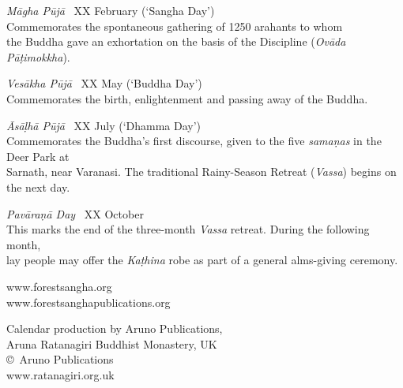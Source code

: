 {{\emph{Māgha Pūjā} \spacedcdot\ XX February (`Sangha Day')\\
Commemorates the spontaneous gathering of 1250 arahants to whom\\
the Buddha gave an exhortation on the basis of the Discipline (\emph{Ovāda Pāṭimokkha}).

\emph{Vesākha Pūjā} \spacedcdot\ XX May (`Buddha Day')\\
Commemorates the birth, enlightenment and passing away of the Buddha.

\emph{Āsāḷhā Pūjā} \spacedcdot\ XX July (`Dhamma Day')\\
Commemorates the Buddha's first discourse, given to the five \emph{samaṇas} in the Deer Park at\\
Sarnath, near Varanasi. The traditional Rainy-Season Retreat (\emph{Vassa}) begins on the next day.

\emph{Pavāraṇā Day} \spacedcdot\ XX October\\
This marks the end of the three-month \emph{Vassa} retreat. During the following month,\\
lay people may offer the \emph{Kaṭhina} robe as part of a general alms-giving ceremony.

\vspace{0.3\baselineskip}

www.forestsangha.org\\
www.forestsanghapublications.org

Calendar production by Aruno Publications,\\
Aruna Ratanagiri Buddhist Monastery, UK\\
\copyright\ Aruno Publications \the\year\\
www.ratanagiri.org.uk

\vspace{0.9\baselineskip}

}

}%


